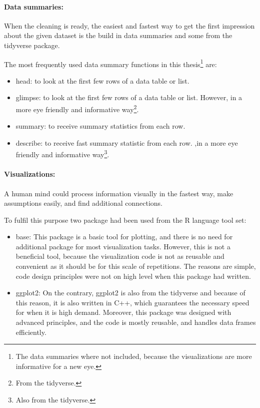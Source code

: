 		\paragraph{Data summaries:}
		When the cleaning is ready, the easiest and fastest way to get the first impression about the given dataset is the build in data summaries and some from the tidyverse package.

		The most frequently used data summary functions in this thesis\footnote{The data summaries where not included, because the visualizations are more informative for a new eye.} are:
		\begin{itemize}
			\item{head:} to look at the first few rows of a data table or list.
			\item{glimpse:} to look at the first few rows of a data table or list. However, in a more eye friendly and informative way\footnote{From the tidyverse.}.
			\item{summary:} to receive summary statistics from each row.
			\item{describe:} to receive fast summary statistic from each row. ,in  a more eye friendly and informative way\footnote{Also from the tidyverse.}.
		\end{itemize}
		\paragraph{Visualizations:}
		A human mind could process information visually in the fastest way, make assumptions easily, and find additional connections. 

		To fulfil this purpose two package had been used from the R language tool set:
		\begin{itemize}
			\item{base:} This package is a basic tool for plotting, and there is no need for additional package for most visualization tasks. However, this is not a beneficial tool, because the visualization code is not as reusable and convenient as it should be for this scale of repetitions. The reasons are simple, code design principles were not on high level when this package had written.
			\item{ggplot2:} On the contrary, ggplot2 is also from the tidyverse and because of this reason, it is also written in C++, which guarantees the necessary speed for when it is high demand. Moreover, this package was designed with advanced principles, and the code is mostly reusable, and handles data frames efficiently. 
		\end{itemize} 


